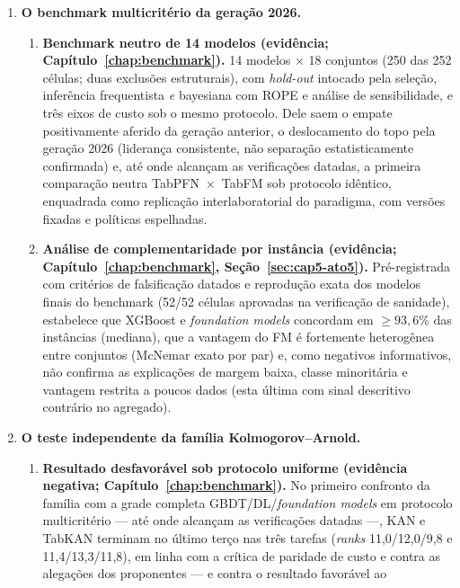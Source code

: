 \begin{enumerate}
  \item \textbf{O benchmark multicritério da geração 2026.}
  \begin{enumerate}
  \item \textbf{Benchmark neutro de 14 modelos
    (evidência; Capítulo~\ref{chap:benchmark}).} 14 modelos $\times$ 18
    conjuntos (250 das 252 células; duas exclusões estruturais), com
    \emph{hold-out} intocado pela seleção, inferência frequentista \emph{e}
    bayesiana com ROPE e análise de sensibilidade, e três eixos de custo
    sob o mesmo protocolo. Dele saem o empate positivamente aferido
    da geração
    anterior, o deslocamento do topo pela geração 2026 (liderança
    consistente, não separação estatisticamente confirmada) e, até
    onde alcançam as
    verificações
    datadas, a primeira comparação neutra
    TabPFN~$\times$~TabFM sob protocolo idêntico, enquadrada como
    replicação interlaboratorial do paradigma, com versões fixadas e
    políticas espelhadas.
  \item \textbf{Análise de complementaridade por instância (evidência;
    Capítulo~\ref{chap:benchmark}, Seção~\ref{sec:cap5-ato5}).}
    Pré-registrada com critérios de falsificação datados e reprodução
    exata dos modelos finais do benchmark (52/52 células aprovadas na verificação
    de sanidade), estabelece que XGBoost e \emph{foundation models}
    concordam em ${\ge}93{,}6\%$ das instâncias (mediana), que a
    vantagem do FM é fortemente heterogênea entre conjuntos (McNemar
    exato por par) e, como negativos informativos, não confirma as
    explicações de margem baixa, classe minoritária e vantagem restrita
    a poucos dados (esta última com sinal descritivo contrário no
    agregado).
  \end{enumerate}
  \item \textbf{O teste independente da família Kolmogorov--Arnold.}
  \begin{enumerate}
  \item \textbf{Resultado desfavorável sob protocolo uniforme
    (evidência negativa;
    Capítulo~\ref{chap:benchmark}).} No primeiro confronto da família
    com a grade completa GBDT/DL/\emph{foundation models} em protocolo
    multicritério --- até onde alcançam as verificações datadas ---, KAN
    e TabKAN terminam no último terço nas três tarefas
    (\emph{ranks} 11,0/12,0/9,8 e 11,4/13,3/11,8), em linha com a
    crítica de paridade de custo \citep{kancritical2024} e contra as
    alegações dos proponentes --- e contra o resultado favorável ao

\end{enumerate}
\end{enumerate}
